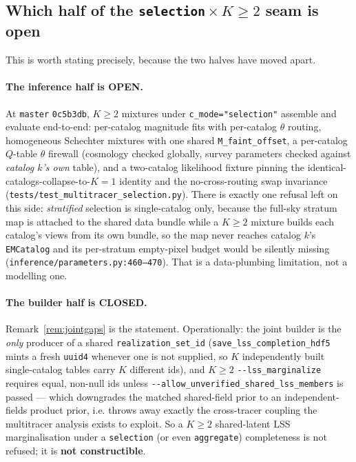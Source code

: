 \subsection{Which half of the \texttt{selection}\,$\times\,K\!\ge\!2$ seam is open}
\label{sec:seam}

This is worth stating precisely, because the two halves have moved apart.

\paragraph{The inference half is OPEN.}  At \texttt{master} \texttt{0c5b3db},
$K\ge2$ mixtures under \verb|c_mode="selection"| assemble and evaluate
end-to-end: per-catalog magnitude fits with per-catalog $\theta$ routing,
homogeneous Schechter mixtures with one shared \verb|M_faint_offset|, a
per-catalog $Q$-table $\theta$ firewall (cosmology checked globally, survey
parameters checked against \emph{catalog $k$'s own} table), and a two-catalog
likelihood fixture pinning the identical-catalogs-collapse-to-$K{=}1$ identity
and the no-cross-routing swap invariance
(\texttt{tests/test\_multitracer\_selection.py}).  There is exactly one refusal
left on this side: \emph{stratified} selection is single-catalog only, because
the full-sky stratum map is attached to the shared data bundle while a $K\ge2$
mixture builds each catalog's views from its own bundle, so the map never
reaches catalog $k$'s \verb|EMCatalog| and its per-stratum empty-pixel budget
would be silently missing (\texttt{inference/parameters.py:460--470}).  That is
a data-plumbing limitation, not a modelling one.

\paragraph{The builder half is CLOSED.}  Remark~\ref{rem:jointgaps} is the
statement.  Operationally: the joint builder is the \emph{only} producer of a
shared \verb|realization_set_id|
(\verb|save_lss_completion_hdf5| mints a fresh \verb|uuid4| whenever one is not
supplied, so $K$ independently built single-catalog tables carry $K$ different
ids), and $K\ge2$ \verb|--lss_marginalize| requires equal, non-null ids unless
\verb|--allow_unverified_shared_lss_members| is passed --- which downgrades the
matched shared-field prior to an independent-fields product prior, i.e. throws
away exactly the cross-tracer coupling the multitracer analysis exists to
exploit.  So a $K\ge2$ shared-latent LSS marginalisation under a
\texttt{selection} (or even \texttt{aggregate}) completeness is not refused; it
is \textbf{not constructible}.

